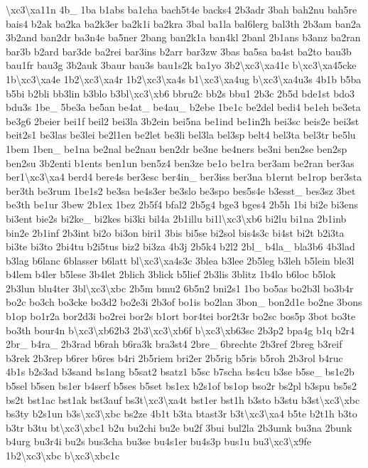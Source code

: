 \begin{DoxyCompactItemize}
\textbackslash{}xc3\textbackslash{}xa11n 4b\-\_\- 1ba b1abs ba1cha bach5t4e backs4 2b3adr 3bah bah2nu bah5re bais4 b2ak ba2ka ba2k3er ba2k1i ba2kra 3bal ba1la bal6lerg bal3th 2b3am ban2a 3b2and ban2dr ba3n4e ba5ner 2bang ban2k1a ban4kl 2banl 2b1ans b3anz ba2ran bar3b b2ard bar3de ba2rei bar3ins b2arr bar3zw 3bas ba5sa ba4st ba2to bau3b bau1fr bau3g 3b2auk 3baur bau3s bau1s2k ba1yo 3b2\textbackslash{}xc3\textbackslash{}xa41c b\textbackslash{}xc3\textbackslash{}xa45cke 1b\textbackslash{}xc3\textbackslash{}xa4e 1b2\textbackslash{}xc3\textbackslash{}xa4r 1b2\textbackslash{}xc3\textbackslash{}xa4s b1\textbackslash{}xc3\textbackslash{}xa4ug b\textbackslash{}xc3\textbackslash{}xa4u3s 4b1b b5ba b5bi b2bli bb3lin b3blo b3bl\textbackslash{}xc3\textbackslash{}xb6 bbru2c bb2s bbu1 2b3c 2b5d bde1st bdo3 bdu3s 1be\-\_\- 5be3a be5an be4at\-\_\- be4au\-\_\- b2ebe 1be1c be2del bedi4 be1eh be3eta be3g6 2beier bei1f beil2 bei3la 3b2ein bei5na be1ind be1in2h bei3sc beis2e bei3st beit2s1 be3las be3lei be2l1en be2let be3li bel3la bel3sp belt4 bel3ta bel3tr be5lu 1bem 1ben\-\_\- be1na be2nal be2nau ben2dr be3ne be4ners be3ni ben2se ben2sp ben2su 3b2enti b1ents ben1un ben5z4 ben3ze be1o be1ra ber3am be2ran ber3as ber1\textbackslash{}xc3\textbackslash{}xa4 berd4 bere4s ber3esc ber4in\-\_\- ber3iss ber3na b1ernt be1rop ber3sta ber3th be3rum 1be1s2 be3sa be4s3er be3slo be3spo bes5s4e b3esst\-\_\- bes3sz 3bet be3th be1ur 3bew 2b1ex 1bez 2b5f4 bfal2 2b5g4 bge3 bges4 2b5h 1bi bi2e bi3ens bi3ent bie2s bi2ke\-\_\- bi2kes bi3ki bil4a 2b1illu bi1l\textbackslash{}xc3\textbackslash{}xb6 bi2lu bi1na 2b1inb bin2e 2b1inf 2b3int bi2o bi3on biri1 3bis bi5se bi2sol bis4s3c bi4st bi2t b2i3ta bi3te bi3to 2bi4tu b2i5tus biz2 bi3za 4b3j 2b5k4 b2l2 2bl\-\_\- b4la\-\_\- bla3b6 4b3lad b3lag b6lanc 6blasser b6latt bl\textbackslash{}xc3\textbackslash{}xa4s3c 3blea b3lee 2b5leg b3leh b5lein ble3l b4lem b4ler b5lese 3b4let 2blich 3blick b5lief 2b3lis 3blitz 1b4lo b6loc b5lok 2b3lun blu4ter 3bl\textbackslash{}xc3\textbackslash{}xbc 2b5m bmu2 6b5n2 bni2s1 1bo bo5as bo2b3l bo3b4r bo2c bo3ch bo3cke bo3d2 bo2e3i 2b3of bo1is bo2lan 3bon\-\_\- bon2d1e bo2ne 3bons b1op bo1r2a bor2d3i bo2rei bor2s b1ort bor4tei bor2t3r bo2sc bos5p 3bot bo3te bo3th bour4n b\textbackslash{}xc3\textbackslash{}xb62b3 2b3\textbackslash{}xc3\textbackslash{}xb6f b\textbackslash{}xc3\textbackslash{}xb63sc 2b3p2 bpa4g b1q b2r4 2br\-\_\- b4ra\-\_\- 2b3rad b6rah b6ra3k bra3st4 2bre\-\_\- 6brechte 2b3ref 2breg b3reif b3rek 2b3rep b6rer b6res b4ri 2b5riem bri2er 2b5rig b5ris b5roh 2b3rol b4ruc 4b1s b2s3ad b3sand bs1ang b5sat2 bsatz1 b5sc b7scha bs4cu b3se b5se\-\_\- bs1e2b b5sel b5sen bs1er b4serf b5ses b5set bs1ex b2s1of bs1op bso2r bs2pl b3spu bs5s2 bs2t bst1ac bst1ak bst3auf bs3t\textbackslash{}xc3\textbackslash{}xa4t bst1er bst1h b3sto b3stu b3st\textbackslash{}xc3\textbackslash{}xbc bs3ty b2s1un b3s\textbackslash{}xc3\textbackslash{}xbc bs2ze 4b1t b3ta btast3r b3t\textbackslash{}xc3\textbackslash{}xa4 b5te b2t1h b3to b3tr b3tu bt\textbackslash{}xc3\textbackslash{}xbc1 b2u bu2chi bu2e bu2f 3bui bul2la 2b3umk bu3na 2bunk b4urg bu3r4i bu2s bus3cha bu3se bu4s1er bu4s3p bus1u bu3\textbackslash{}xc3\textbackslash{}x9fe 1b2\textbackslash{}xc3\textbackslash{}xbc b\textbackslash{}xc3\textbackslash{}xbc1c 
\end{DoxyCompactItemize}
